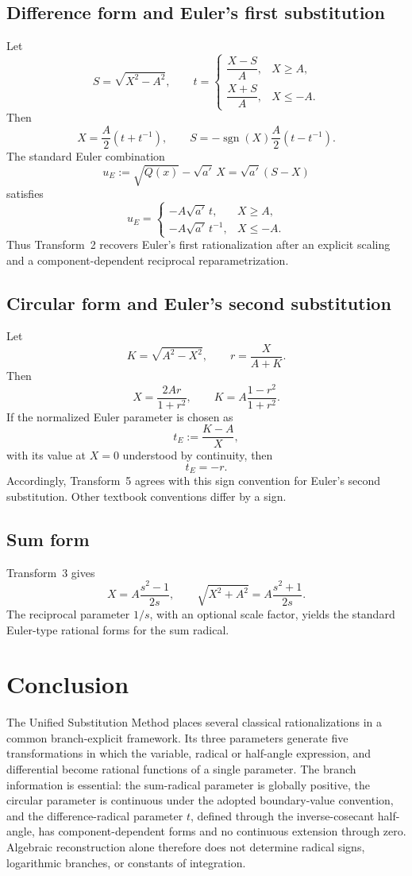 \documentclass[11pt]{article}
\theoremstyle{remark}
\DeclareMathOperator{\sgn}{sgn}
\begin{document}
\subsection*{Difference form and Euler's first substitution}

Let
\[
S=\sqrt{X^2-A^2},
\qquad
t=
\begin{cases}
\dfrac{X-S}{A},&X\ge A,\\[2mm]
\dfrac{X+S}{A},&X\le-A.
\end{cases}
\]
Then
\[
X=\frac{A}{2}\left(t+t^{-1}\right),
\qquad
S=-\sgn(X)\frac{A}{2}\left(t-t^{-1}\right).
\]
The standard Euler combination
\[
u_E:=\sqrt{Q(x)}-\sqrt{a'}\,X
=\sqrt{a'}(S-X)
\]
satisfies
\[
u_E=
\begin{cases}
-A\sqrt{a'}\,t,&X\ge A,\\[1mm]
-A\sqrt{a'}\,t^{-1},&X\le-A.
\end{cases}
\]
Thus Transform~2 recovers Euler's first rationalization after an explicit scaling and a component-dependent reciprocal reparametrization.

\subsection*{Circular form and Euler's second substitution}

Let
\[
K=\sqrt{A^2-X^2},
\qquad
r=\frac{X}{A+K}.
\]
Then
\[
X=\frac{2Ar}{1+r^2},
\qquad
K=A\frac{1-r^2}{1+r^2}.
\]
If the normalized Euler parameter is chosen as
\[
t_E:=\frac{K-A}{X},
\]
with its value at $X=0$ understood by continuity, then
\[
t_E=-r.
\]
Accordingly, Transform~5 agrees with this sign convention for Euler's second substitution. Other textbook conventions differ by a sign.

\subsection*{Sum form}

Transform~3 gives
\[
X=A\frac{s^2-1}{2s},
\qquad
\sqrt{X^2+A^2}=A\frac{s^2+1}{2s}.
\]
The reciprocal parameter $1/s$, with an optional scale factor, yields the standard Euler-type rational forms for the sum radical.

\section{Conclusion}

The Unified Substitution Method places several classical rationalizations in a common branch-explicit framework. Its three parameters generate five transformations in which the variable, radical or half-angle expression, and differential become rational functions of a single parameter. The branch information is essential: the sum-radical parameter is globally positive, the circular parameter is continuous under the adopted boundary-value convention, and the difference-radical parameter $t$, defined through the inverse-cosecant half-angle, has component-dependent forms and no continuous extension through zero. Algebraic reconstruction alone therefore does not determine radical signs, logarithmic branches, or constants of integration.
\end{document}
